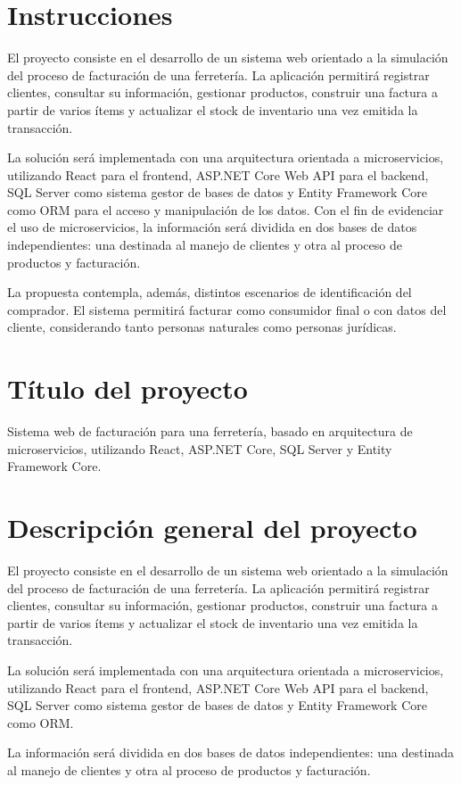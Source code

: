\documentclass[12pt]{article}
\begin{document}
\section{Instrucciones}
El proyecto consiste en el desarrollo de un sistema web orientado a la simulación del proceso de facturación de una ferretería. La aplicación permitirá registrar clientes, consultar su información, gestionar productos, construir una factura a partir de varios ítems y actualizar el stock de inventario una vez emitida la transacción.

La solución será implementada con una arquitectura orientada a microservicios, utilizando React para el frontend, ASP.NET Core Web API para el backend, SQL Server como sistema gestor de bases de datos y Entity Framework Core como ORM para el acceso y manipulación de los datos. Con el fin de evidenciar el uso de microservicios, la información será dividida en dos bases de datos independientes: una destinada al manejo de clientes y otra al proceso de productos y facturación.

La propuesta contempla, además, distintos escenarios de identificación del comprador. El sistema permitirá facturar como consumidor final o con datos del cliente, considerando tanto personas naturales como personas jurídicas.

\section{Título del proyecto}
Sistema web de facturación para una ferretería, basado en arquitectura de microservicios, utilizando React, ASP.NET Core, SQL Server y Entity Framework Core.

\section{Descripción general del proyecto}
El proyecto consiste en el desarrollo de un sistema web orientado a la simulación del proceso de facturación de una ferretería. La aplicación permitirá registrar clientes, consultar su información, gestionar productos, construir una factura a partir de varios ítems y actualizar el stock de inventario una vez emitida la transacción.

La solución será implementada con una arquitectura orientada a microservicios, utilizando React para el frontend, ASP.NET Core Web API para el backend, SQL Server como sistema gestor de bases de datos y Entity Framework Core como ORM.

La información será dividida en dos bases de datos independientes: una destinada al manejo de clientes y otra al proceso de productos y facturación.
\end{document}
